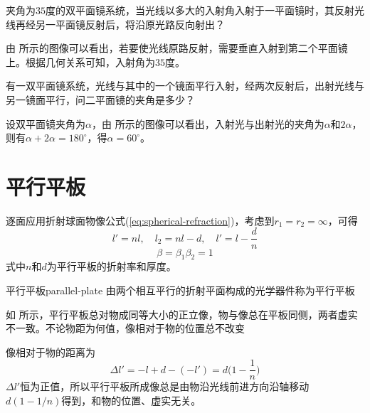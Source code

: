 \documentclass[cn,10pt,chinesefont=founder,math=newtx,cite=super,twoside]{elegantbook}
\begin{document}
\begin{problem}
	夹角为$35$度的双平面镜系统，当光线以多大的入射角入射于一平面镜时，其反射光线再经另一平面镜反射后，将沿原光路反向射出？
\end{problem}
\begin{solution}
	由 所示的图像可以看出，若要使光线原路反射，需要垂直入射到第二个平面镜上。根据几何关系可知，入射角为$35$度。
\end{solution}

\begin{problem}
	有一双平面镜系统，光线与其中的一个镜面平行入射，经两次反射后，出射光线与另一镜面平行，问二平面镜的夹角是多少？
\end{problem}
\begin{solution}
	设双平面镜夹角为$\alpha$，由 所示的图像可以看出，入射光与出射光的夹角为$\alpha$和$2\alpha$，则有$\alpha+2\alpha=180^{\circ}$，得$\alpha=60^{\circ}$。
\end{solution}

\section{平行平板}
\label{sect:parallel-plate}

逐面应用折射球面物像公式(\ref{eq:spherical-refraction})，考虑到$r_1=r_2=\infty$，可得
\begin{equation}
l'=nl,\quad l_2=nl-d,\quad l'=l-\frac{d}{n}
\end{equation}
\begin{equation}
\beta=\beta_1\beta_2=1
\end{equation}
式中$n$和$d$为平行平板的折射率和厚度。

\begin{definition}{平行平板}{parallel-plate}
	由两个相互平行的折射平面构成的光学器件称为平行平板
\end{definition}

\begin{property}
如 所示，平行平板总对物成同等大小的正立像，物与像总在平板同侧，两者虚实不一致。不论物距为何值，像相对于物的位置总不改变
\end{property}

像相对于物的距离为
\begin{equation}
\Delta l'=-l+d-(-l')=d\bigg(1-\frac{1}{n}\bigg)
\end{equation}
$\Delta l'$恒为正值，所以平行平板所成像总是由物沿光线前进方向沿轴移动$d(1-1/n)$得到，和物的位置、虚实无关。
\end{document}
